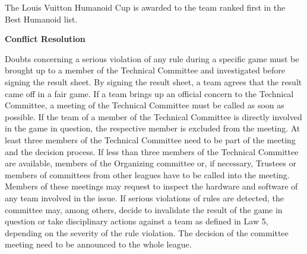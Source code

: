 \bigskip

The Louis Vuitton Humanoid Cup is awarded to the team ranked first in the Best Humanoid list.

\bigskip

{\bfseries Conflict Resolution}

\headlinebox

Doubts concerning a serious violation of any rule during a specific game must be brought up to a member of the Technical Committee and investigated before signing the result sheet. By signing the result sheet, a team agrees that the result came off in a fair game. If a team brings up an official concern to the Technical Committee, a meeting of the Technical Committee must be called as soon as possible. If the team of a member of the Technical Committee is directly involved in the game in question, the respective member is excluded from the meeting. At least three members of the Technical Committee need to be part of the meeting and the decision process. If less than three members of the Technical Committee are available, members of the Organizing committee or, if necessary, Trustees or members of committees from other leagues have to be called into the meeting. Members of these meetings may request to inspect the hardware and software of any team involved in the issue. If serious violations of rules are detected, the committee may, among others, decide to invalidate the result of the game in question or take disciplinary actions against a team as defined in Law 5, depending on the severity of the rule violation. The decision of the committee meeting need to be announced to the whole league.
